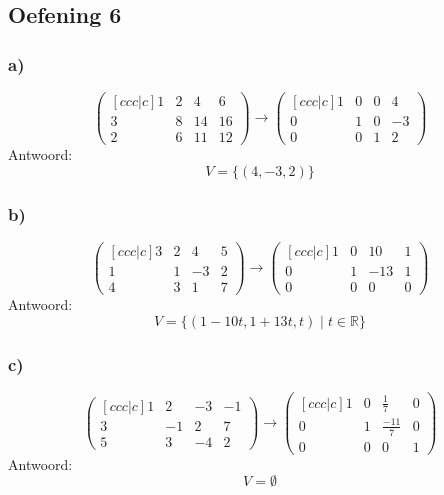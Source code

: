 \documentclass[lineaire_algebra_oplossingen.tex]{subfiles}
\begin{document}
\subsection{Oefening 6}
\subsubsection*{a)}
\[
\begin{pmatrix}[ccc|c]
1 &  2 &  4 &  6\\
3 &  8 & 14 & 16\\
2 &  6 & 11 & 12
\end{pmatrix}
\longrightarrow
\begin{pmatrix}[ccc|c]
1 &  0 &  0 &  4\\
0 &  1 &  0 & -3\\
0 &  0 &  1 &  2
\end{pmatrix}
\]
Antwoord:
\[
V=\{(4,-3,2)\}
\]

\subsubsection*{b)}
\[
\begin{pmatrix}[ccc|c]
3 &  2 &  4 &  5\\
1 &  1 & -3 &  2\\
4 &  3 &  1 &  7
\end{pmatrix}
\longrightarrow
\begin{pmatrix}[ccc|c]
1 &  0 & 10 &  1\\
0 &  1 & -13&  1\\
0 &  0 &  0 &  0
\end{pmatrix}
\]
Antwoord:
\[
V=\{(1-10t,1+13t,t) \mid t \in \mathbb{R}\}
\]

\subsubsection*{c)}
\[
\begin{pmatrix}[ccc|c]
1 &  2 & -3 & -1\\
3 & -1 &  2 &  7\\
5 &  3 & -4 &  2
\end{pmatrix}
\longrightarrow
\begin{pmatrix}[ccc|c]
1 &  0 & \frac{1}{7} &  0\\
0 &  1 & \frac{-11}{7}&  0\\
0 &  0 &  0 &  1
\end{pmatrix}
\]
Antwoord:
\[
V=\emptyset
\]
\end{document}
